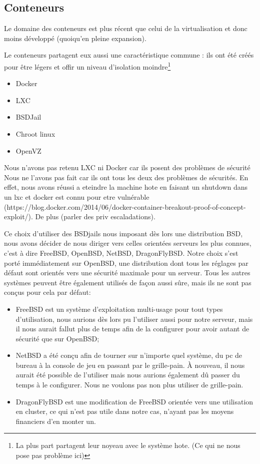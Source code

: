 \documentclass[10pt,a4paper]{article}
\begin{document}
\subsection{Conteneurs}
Le domaine des conteneurs est plus récent que celui de la virtualisation et donc moins développé (quoiqu'en pleine expansion).

Le conteneurs partagent eux aussi une caractéristique commune : ils ont été créés pour être légers et offir un niveau d'isolation moindre\footnote{La plus part partagent leur noyeau avec le système hote. (Ce qui ne nous pose pas problème ici)}

\begin{itemize}
    \item{Docker}
    \item{LXC}
    \item{BSDJail}
    \item{Chroot linux}
    \item{OpenVZ}
\end{itemize}

Nous n'avons pas retenu LXC ni Docker car ils posent des problèmes de sécurité
Nous ne l'avons pas fait car ils ont tous les deux des problèmes de sécurités.
En effet, nous avons réussi a eteindre la machine hote en faisant un shutdown dans un lxc et docker est connu pour etre vulnérable (https://blog.docker.com/2014/06/docker-container-breakout-proof-of-concept-exploit/).
De plus (parler des priv escaladations).


Ce choix d'utiliser des BSDjails nous imposant dès lors une distribution BSD, nous avons décider de nous diriger vers celles orientées serveurs les plus connues,
c'est à dire FreeBSD, OpenBSD, NetBSD, DragonFlyBSD.
Notre choix s'est porté immédiatement sur OpenBSD, une distribution dont tous les réglages par défaut sont orientés vers une sécurité maximale pour un serveur.
Tous les autres systèmes peuvent être également utilisés de façon aussi sûre, mais ils ne sont pas conçus pour cela par défaut:
\begin{itemize}
    \item FreeBSD est un système d'exploitation multi-usage pour tout types d'utilisation, nous aurions dès lors pu l'utiliser aussi pour notre serveur, mais il nous aurait fallut plus de temps afin de la configurer pour avoir autant de sécurité que sur OpenBSD;
    \item NetBSD a été conçu afin de tourner sur n'importe quel système, du pc de bureau à la console de jeu en passant par le grille-pain. À nouveau, il nous aurait été possible de l'utiliser mais nous aurions également dû passer du temps à le configurer. Nous ne voulons pas non plus utiliser de grille-pain.
    \item DragonFlyBSD est une modification de FreeBSD orientée vers une utilisation en cluster, ce qui n'est pas utile dans notre cas, n'ayant pas les moyens financiers d'en monter un.
\end{itemize}
\end{document}
